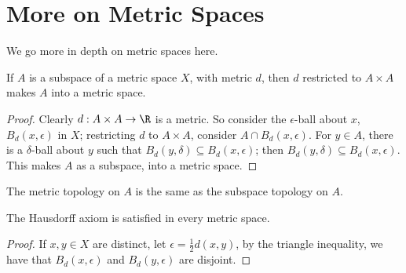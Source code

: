 
\section{More on Metric Spaces}

We go more in depth on metric spaces here.

\begin{theorem}\label{2.3.1}
    If $A$ is a subspace of a metric space $X$, with metric  $d$, then  $d$
    restricted to  $A \times A$ makes  $A$ into a metric space.
\end{theorem}
\begin{proof}
    Clearly $d:A \times A \rightarrow \R$ is a metric. So consider the
    $\epsilon$-ball about $x$, $B_d(x,\epsilon)$ in $X$; restricting  $d$ to
    $A \times A$, consider  $A \cap B_d(x,\epsilon)$. For $y \in A$, there is
    a  $\delta$-ball about  $y$ such that  $B_d(y,\delta) \subseteq
    B_d(x,\epsilon)$; then $B_d(y,\delta) \subseteq B_d(x,\epsilon)$. This makes
    $A$ as a subspace, into a metric space.
\end{proof}
\begin{corollary}
    The metric topology on $A$ is the same as the subspace topology on  $A$.
\end{corollary}

\begin{theorem}\label{2.3.2}
    The Hausdorff axiom is satisfied in every metric space.
\end{theorem}
\begin{proof}
    If $x,y \in X$ are distinct, let  $\epsilon=\frac{1}{2}d(x,y)$, by the triangle inequality, we
    have that $B_d(x,\epsilon)$ and $B_d(y,\epsilon)$ are disjoint.
\end{proof}

